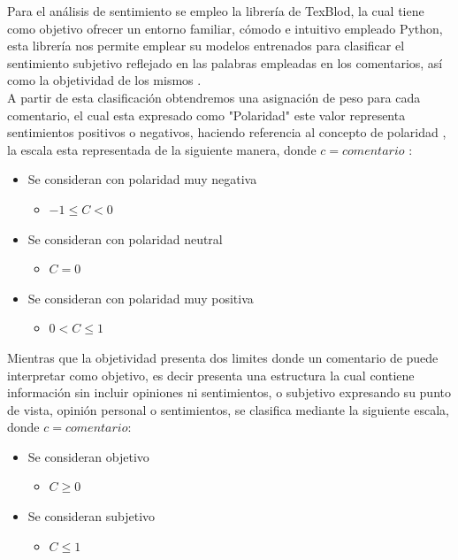Para el análisis de sentimiento se empleo la librería de TexBlod, la cual tiene como objetivo ofrecer un entorno familiar, cómodo e intuitivo empleado Python, esta librería nos permite emplear su modelos entrenados para clasificar el sentimiento subjetivo reflejado en las palabras empleadas en los comentarios, así como la objetividad de los mismos \cite{steven2024}.\\

A partir de esta clasificación obtendremos una asignación de peso para cada comentario, el cual esta expresado como "Polaridad" este valor representa sentimientos positivos o negativos, haciendo referencia al concepto de polaridad \cite{quiroga2016}, la escala esta representada de la siguiente manera, donde $ c = comentario$ :\\

\begin{itemize}
	\item Se consideran con polaridad muy negativa 
	\begin{itemize}
		\item $ -1\leq C < 0 $
	\end{itemize}
	\item Se consideran con polaridad neutral 
	\begin{itemize}
		\item $ C = 0 $
	\end{itemize}
		\item Se consideran con polaridad muy positiva 
	\begin{itemize}
		\item $0< C  \leq 1 $
	\end{itemize}
\end{itemize}

Mientras que la objetividad presenta dos limites donde un comentario de puede interpretar como objetivo, es decir presenta una estructura la cual contiene información sin incluir opiniones ni sentimientos, o subjetivo expresando su punto de vista, opinión personal o sentimientos, se clasifica mediante la siguiente escala, donde $ c = comentario$: \\

\begin{itemize}
	\item Se consideran objetivo
	\begin{itemize}
		\item $ C \geq 0 $
	\end{itemize}
	\item Se consideran subjetivo
	\begin{itemize}
		\item $ C \leq 1 $
	\end{itemize}
\end{itemize}

